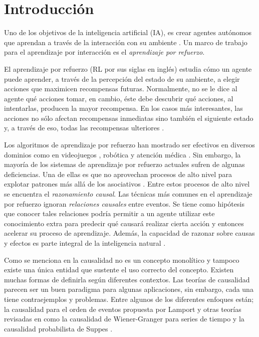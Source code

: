 \chapter{Introducción}



\graphicspath{{Chapter1/Figs/}}

Uno de los objetivos de la inteligencia artificial (IA), es crear agentes autónomos que aprendan
a través de la interacción con su ambiente \cite{surveyDRL2017}.
Un marco de trabajo para el aprendizaje por interacción es el \textit{aprendizaje por
refuerzo}.


El aprendizaje por refuerzo (RL por sus siglas en inglés) estudia cómo un agente puede aprender, a través de la percepción del estado de su ambiente,
a elegir acciones que maximicen recompensas futuras. 
Normalmente, no se le dice al agente qué acciones
tomar, en cambio, éste debe descubrir qué acciones, al intentarlas, producen la mayor recompensa.
En los casos más interesantes, las acciones no sólo afectan recompensas inmediatas
sino también el siguiente estado y, a través de eso, todas las recompensas ulteriores \cite{sutton_barto_2018}.

Los algoritmos de aprendizaje por refuerzo 
han mostrado ser efectivos en diversos dominios como en videojuegos \cite{mnih2013playing, vinyals2019grandmaster}, 
robótica \cite{openai2019solving}
y atención médica \cite{gottesman2018evaluating}.
Sin embargo, la mayoría de los  sistemas de aprendizaje por refuerzo actuales sufren de algunas deficiencias. Una de ellas es que no aprovechan procesos de
alto nivel para 
explotar patrones más allá de los asociativos \cite{garnelo2016deep, playingagainstnature2018}. Entre estos procesos de alto nivel se encuentra el \textit{razonamiento causal}. Las técnicas más comunes
en el aprendizaje por refuerzo ignoran \textit{relaciones causales} entre eventos.
Se tiene como hipótesis que conocer tales relaciones podría permitir a un agente 
utilizar este conocimiento extra
para predecir qué causará realizar cierta acción
y entonces acelerar su proceso de aprendizaje.
Además, la capacidad de razonar sobre causas y efectos es parte integral de
la inteligencia natural \cite{nair2019causal}.


Como se menciona en \cite{theoryofcausalities2006} 
la causalidad no es un concepto monolítico y tampoco
existe una única entidad que sustente el uso correcto
del concepto. Existen muchas formas de definirla según diferentes contextos. Las teorías de causalidad
parecen ser un buen paradigma para algunas aplicaciones,
sin embargo, cada una tiene contraejemplos y problemas.
Entre algunos de los diferentes enfoques 
están; la causalidad para
el orden de eventos propuesta por Lamport \cite{lamport2019time} y otras teorías revisadas en
\cite{holland1986statistics} como la causalidad de Wiener-Granger para
series de tiempo \cite{granger1969investigating} y la 
causalidad probabilista de Suppes \cite{suppes1973probabilistic}. 

